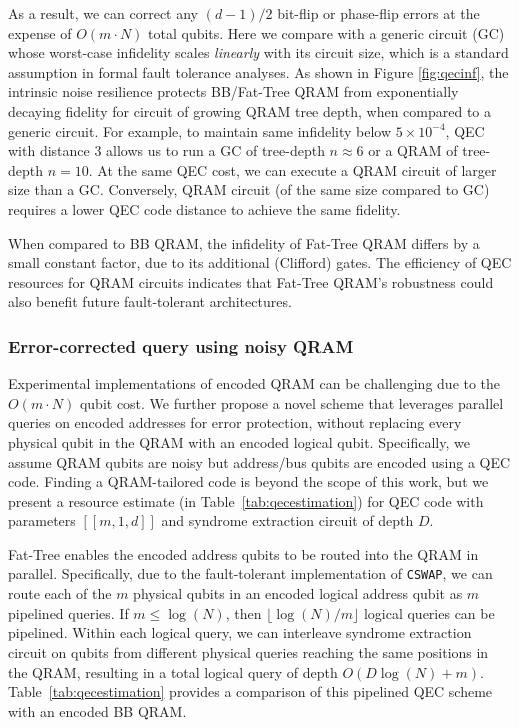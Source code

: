 As a result, we can correct any $(d-1)/2$ bit-flip or phase-flip errors at the expense of $O(m\cdot N)$ total qubits. Here we compare with a generic circuit (GC) whose worst-case infidelity scales \emph{linearly} with its circuit size, which is a standard assumption in formal fault tolerance analyses. As shown in Figure \ref{fig:qecinf}, the intrinsic noise resilience protects BB/Fat-Tree QRAM from exponentially decaying fidelity for circuit of growing QRAM tree depth, when compared to a generic circuit. For example, to maintain same infidelity below $5\times 10^{-4}$, QEC with distance 3 allows us to run a GC of tree-depth $n\approx 6$ or a QRAM of tree-depth $n=10$. At the same QEC cost, we can execute a QRAM circuit of larger size than a GC. Conversely, QRAM circuit (of the same size compared to GC) requires a lower QEC code distance to achieve the same fidelity.

When compared to BB QRAM, the infidelity of Fat-Tree QRAM differs by a small constant factor, due to its additional (Clifford) gates. The efficiency of QEC resources for QRAM circuits indicates that Fat-Tree QRAM's robustness could also benefit future fault-tolerant architectures.

\subsubsection{Error-corrected query using noisy QRAM}
Experimental implementations of encoded QRAM can be challenging due to the $O(m\cdot N)$ qubit cost. We further propose a novel scheme that leverages parallel queries on encoded addresses for error protection, without replacing every physical qubit in the QRAM with an encoded logical qubit. Specifically, we assume QRAM qubits are noisy but address/bus qubits are encoded using a QEC code. Finding a QRAM-tailored code is beyond the scope of this work, but we present a resource estimate (in Table~\ref{tab:qecestimation}) for QEC code with parameters $[[m, 1, d]]$ and syndrome extraction circuit of depth $D$.

Fat-Tree enables the encoded address qubits to be routed into the QRAM in parallel. Specifically, due to the fault-tolerant implementation of \texttt{CSWAP}, we can route each of the $m$ physical qubits in an encoded logical address qubit as $m$ pipelined queries. If $m\leq \log(N)$, then $\lfloor \log(N)/m\rfloor$ logical queries can be pipelined. Within each logical query, we can interleave syndrome extraction circuit on qubits from different physical queries reaching the same positions in the QRAM, resulting in a total logical query of depth $O(D\log(N) + m)$. Table~\ref{tab:qecestimation} provides a comparison of this pipelined QEC scheme with an encoded BB QRAM.

